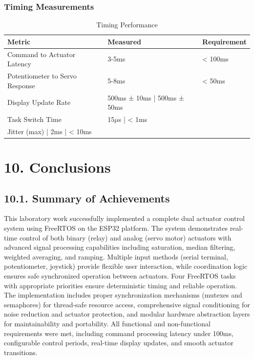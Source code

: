 \documentclass[12pt]{article}
\begin{document}
\subsubsection*{Timing Measurements}

\begin{table}[H]
	\centering
	\caption{Timing Performance}
	\label{tab:timing-performance}
	\begin{tabular}{|l|l|l|}
		\hline
		\textbf{Metric} & \textbf{Measured} & \textbf{Requirement} \\
		\hline
		Command to Actuator Latency & 3-5ms & < 100ms \\
		\hline
		Potentiometer to Servo Response & 5-8ms & < 50ms \\
		\hline
		Display Update Rate & 500ms ± 10ms | 500ms ± 50ms \\
		\hline
		Task Switch Time & 15$\mu$s | < 1ms \\
		\hline
		Jitter (max) | 2ms | < 10ms \\
		\hline
	\end{tabular}
\end{table}

\section*{10. Conclusions}

\subsection*{10.1. Summary of Achievements}

This laboratory work successfully implemented a complete dual actuator control system using FreeRTOS on the ESP32 platform. The system demonstrates real-time control of both binary (relay) and analog (servo motor) actuators with advanced signal processing capabilities including saturation, median filtering, weighted averaging, and ramping. Multiple input methods (serial terminal, potentiometer, joystick) provide flexible user interaction, while coordination logic ensures safe synchronized operation between actuators. Four FreeRTOS tasks with appropriate priorities ensure deterministic timing and reliable operation. The implementation includes proper synchronization mechanisms (mutexes and semaphores) for thread-safe resource access, comprehensive signal conditioning for noise reduction and actuator protection, and modular hardware abstraction layers for maintainability and portability. All functional and non-functional requirements were met, including command processing latency under 100ms, configurable control periods, real-time display updates, and smooth actuator transitions.
\end{document}
